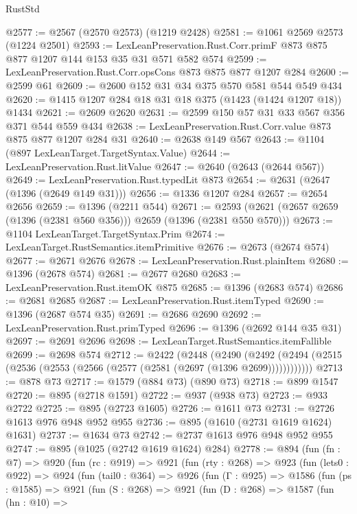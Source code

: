 \begin{lexlean}{RustStd}
\begin{coremodule}
{\begin{coremodule}
{{{{{{{{{@2577 := @2567 (@2570 @2573) (@1219 @2428)
@2581 := @1061 @2569 @2573 (@1224 @2501)
@2593 := LexLeanPreservation.Rust.Corr.primF @873 @875 @877 @1207 @144 @153 @35 @31 @571 @582 @574
@2599 := LexLeanPreservation.Rust.Corr.opsCons @873 @875 @877 @1207 @284
@2600 := @2599 @61
@2609 := @2600 @152 @31 @34 @375 @570 @581 @544 @549 @434
@2620 := @1415 @1207 @284 @18 @31 @18 @375 (@1423 (@1424 @1207 @18)) @1434
@2621 := @2609 @2620
@2631 := @2599 @150 @57 @31 @33 @567 @356 @371 @544 @559 @434
@2638 := LexLeanPreservation.Rust.Corr.value @873 @875 @877 @1207 @284 @31
@2640 := @2638 @149 @567
@2643 := @1104 (@897 LexLeanTarget.TargetSyntax.Value)
@2644 := LexLeanPreservation.Rust.litValue
@2647 := @2640 (@2643 (@2644 @567))
@2649 := LexLeanPreservation.Rust.typedLit @873
@2654 := @2631 (@2647 (@1396 (@2649 @149 @31)))
@2656 := @1336 @1207 @284
@2657 := @2654 @2656
@2659 := @1396 (@2211 @544)
@2671 := @2593 (@2621 (@2657 @2659 (@1396 (@2381 @560 @356))) @2659 (@1396 (@2381 @550 @570)))
@2673 := @1104 LexLeanTarget.TargetSyntax.Prim
@2674 := LexLeanTarget.RustSemantics.itemPrimitive
@2676 := @2673 (@2674 @574)
@2677 := @2671 @2676
@2678 := LexLeanPreservation.Rust.plainItem
@2680 := @1396 (@2678 @574)
@2681 := @2677 @2680
@2683 := LexLeanPreservation.Rust.itemOK @875
@2685 := @1396 (@2683 @574)
@2686 := @2681 @2685
@2687 := LexLeanPreservation.Rust.itemTyped
@2690 := @1396 (@2687 @574 @35)
@2691 := @2686 @2690
@2692 := LexLeanPreservation.Rust.primTyped
@2696 := @1396 (@2692 @144 @35 @31)
@2697 := @2691 @2696
@2698 := LexLeanTarget.RustSemantics.itemFallible
@2699 := @2698 @574
@2712 := @2422
    (@2448
      (@2490 (@2492 (@2494 (@2515 (@2536 (@2553 (@2566 (@2577 (@2581 (@2697 (@1396 @2699))))))))))))
@2713 := @878 @73
@2717 := @1579 (@884 @73) (@890 @73)
@2718 := @899 @1547
@2720 := @895 (@2718 @1591)
@2722 := @937 (@938 @73)
@2723 := @933 @2722
@2725 := @895 (@2723 @1605)
@2726 := @1611 @73
@2731 := @2726 @1613 @976 @948 @952 @955
@2736 := @895 (@1610 (@2731 @1619 @1624) @1631)
@2737 := @1634 @73
@2742 := @2737 @1613 @976 @948 @952 @955
@2747 := @895 (@1025 (@2742 @1619 @1624) @284)
@2778 := @894
    (fun (fn : @7) =>
    @920
      (fun (rc : @919) =>
      @921
        (fun (rty : @268) =>
        @923
          (fun (lets0 : @922) =>
          @924
            (fun (tail0 : @364) =>
            @926
              (fun (Γ : @925) =>
              @1586
                (fun (ps : @1585) =>
                @921
                  (fun (S : @268) =>
                  @921
                    (fun (D : @268) =>
                    @1587
                      (fun (hn : @10) =>
}}}}}}}}}
\end{coremodule}}
\end{coremodule}
\end{lexlean}
